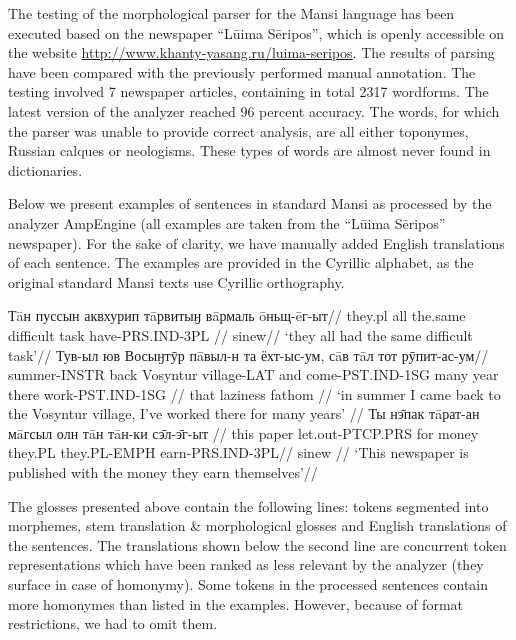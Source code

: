\documentclass[b5paper,notitlepage]{article}
\begin{document}
The testing of the morphological parser for the Mansi language has been executed based on the newspaper “Lūima Sēripos”, which is openly accessible on the website \url{http://www.khanty-yasang.ru/luima-seripos}. The results of parsing have been compared with the previously performed manual annotation. The testing involved 7 newspaper articles, containing in total 2317 wordforms. The latest version of the analyzer reached 96 percent accuracy. The words, for which the parser was unable to provide correct analysis, are all either toponymes, Russian calques or neologisms. These types of words are almost never found in dictionaries.

Below we present examples of sentences in standard Mansi as processed by the analyzer AmpEngine (all examples are taken from the “Lūima Sēripos” newspaper). For the sake of clarity, we have manually added English translations of each sentence. The examples are provided in the Cyrillic alphabet, as the original standard Mansi texts use Cyrillic orthography.

\pex[interpartskip=3ex]
\a
\begingl
\gla Тāн пуссын аквхурип тāрвитыӈ вāрмаль ōньщ-ēг-ыт//
\glb they.{\sc pl} all the.same difficult task have-{\sc PRS.IND}-{\sc 3PL} //
\glc sinew//
\glft ‘they all had the same difficult task’//
\endgl
\a
\begingl[aboveglftskip=2ex]
\gla Тув-ыл юв Восыӈтӯр пāвыл-н та ёхт-ыс-ум, сāв тāл тот рӯпит-ас-ум//
\glb summer-{\sc INSTR} back Vosyntur village-{\sc LAT} and come-{\sc PST.IND}-{\sc 1SG} many year there work-{\sc PST.IND}-{\sc 1SG} //
\glc {} {} {} {} that {} laziness fathom {} {} //
\glft ‘in summer I came back to the Vosyntur village, I’ve worked there for many years’ //
\endgl
\a
\begingl[aboveglftskip=0pt]
\gla Ты нэ̄пак тāрат-ан	мāгсыл олн тāн тāн-ки сэ̄л-э̄г-ыт //
\glb this paper let.out-{\sc PTCP.PRS} for money they.{\sc PL} they.{\sc PL}-{\sc EMPH} earn-{\sc PRS.IND}-{\sc 3PL}//
\glc {} {} {} {} {} sinew {} {} //
\glft ‘This newspaper is published with the money they earn themselves’//
\endgl
\xe

The glosses presented above contain the following lines: tokens segmented into morphemes, stem translation \& morphological glosses and English translations of the sentences.
The translations shown below the second line are concurrent token representations which have been ranked as less relevant by the analyzer (they surface in case of homonymy). Some tokens in the processed sentences contain more homonymes than listed in the examples. However, because of format restrictions, we had to omit them. 
\end{document}
